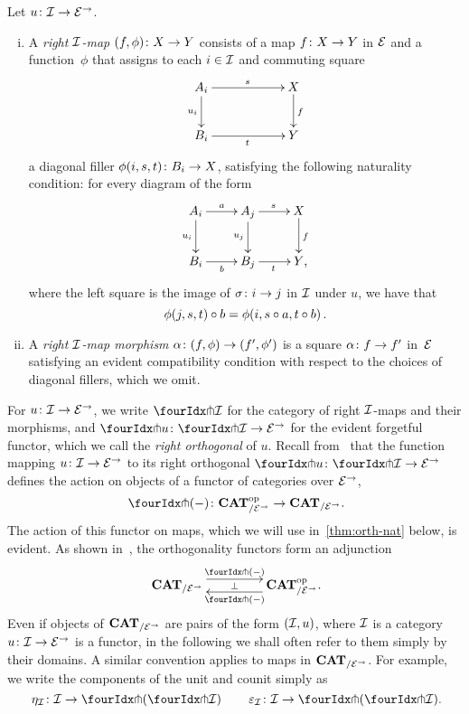 \documentclass[reqno,10pt,a4paper,oneside,draft]{amsart}
\begin{document}
{{\begin{definition} \label{def:right-map}
Let $u \co \cal{I} \to \catE^\to$.
\begin{enumerate}[(i)]
\item A \emph{right $\cal{I}$-map} $(f, \phi) \co X \to Y$ consists of a map $f \co X \to Y$ in $\catE$ and a function~$\phi$ that assigns to each $i \in \cal{I}$ and commuting square
\[
\xymatrix@C=2cm{
  A_i
  \ar[r]^{s}
  \ar[d]_{u_i}
&
  X
  \ar[d]^f
\\
  B_i
  \ar[r]_{t}
&
  Y
}
\]
a diagonal filler $\phi(i,s, t) \co B_i \to X$, satisfying the following naturality condition: for every diagram of the form
\[
\xymatrix{
  A_i
  \ar[r]^{a}
  \ar[d]_{u_i}
&
  A_j
  \ar[r]^{s}
  \ar[d]_{u_j}
&
  X
  \ar[d]^f
\\
  B_i
  \ar[r]_{b}
&
  B_j
  \ar[r]_{t}
&
  Y
\rlap{,}}
\]
where the left square is the image of $\sigma \co i \to j$ in $\cal{I}$ under $u$, we have that
\[
  \phi(j, s, t) \cc b = \phi(i, s \cc a, t \cc b) \, .
\]
\item A \emph{right $\cal{I}$-map morphism} $\alpha \co (f, \phi) \to (f', \phi')$ is a square $\alpha \co f \to f'$ in~$\catE$ satisfying an evident compatibility condition with respect to the choices of diagonal fillers, which we omit.
\end{enumerate}
\end{definition}

For  $u \co \cal{I} \to \catE^\to$, we write $\liftr{\cal{I}}$ for the category of right $\cal{I}$-maps and their morphisms, and 
$\liftr{u} \co \liftr{\cal{I}} \to \catE^\to$ for the evident forgetful functor, which we call the \emph{right orthogonal} of $u$. Recall from~\cite{garner:small-object-argument} that the function mapping $u \co \cal{I} \to \catE^\to$ to its right orthogonal $\liftr{u} \co \liftr{\cal{I}} \to \catE^\to$ defines the action on objects of a functor of categories over $\catE^\to$,
\[
  \liftr{\brarghole} \co \CAT_{/\catE^\to}^{\op} \to \CAT_{/\catE^\to} \rlap{.}
\]
The action of this functor on maps, which we will use in~\cref{thm:orth-nat} below, is evident.
As shown in~\cite[Proposition~3.8]{garner:small-object-argument}, the orthogonality functors form an adjunction
\begin{equation} \label{garner-adjunction}
\begin{gathered}
\xymatrix@C+2em{
  \CAT_{/\catE^\to}
  \ar@<5pt>[r]^-{\liftl{\brarghole}}
  \ar@{}[r]|-{\bot}
&
  \CAT_{/\catE^\to}^{\op} \rlap{.}
  \ar@<5pt>[l]^-{\liftr{\brarghole}}
}
\end{gathered}
\end{equation}
Even if objects of $\CAT_{/\catE^\to}$ are pairs of the form $(\cal{I}, u)$, where $\cal{I}$ is a category $u \co
\cal{I} \to \catE^\to$ is a functor, in the following we shall often refer to them simply by their domains. A similar convention applies
to maps in $\CAT_{/\catE^\to}$. For example, we write the components of the unit and counit simply as 
\[
\eta_\cal{I} \co \cal{I} \to \liftl{(\liftr{\cal{I})}} \, \qquad 
\varepsilon_\cal{I} \co \cal{I} \to \liftr{(\liftl{\cal{I}})} \rlap{.}
\]

}}
\end{document}
